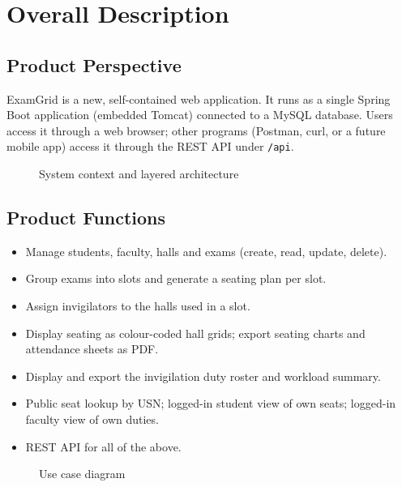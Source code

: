 \documentclass[11pt,a4paper]{article}
\begin{document}
\section{Overall Description}
\subsection{Product Perspective}
ExamGrid is a new, self-contained web application. It runs as a single Spring Boot application (embedded Tomcat) connected to a MySQL database. Users access it through a web browser; other programs (Postman, curl, or a future mobile app) access it through the REST API under \texttt{/api}.

\begin{figure}[H]\centering
\resizebox{0.8\linewidth}{!}{}
\caption{System context and layered architecture}
\end{figure}

\subsection{Product Functions}
\begin{itemize}
  \item Manage students, faculty, halls and exams (create, read, update, delete).
  \item Group exams into slots and generate a seating plan per slot.
  \item Assign invigilators to the halls used in a slot.
  \item Display seating as colour-coded hall grids; export seating charts and attendance sheets as PDF.
  \item Display and export the invigilation duty roster and workload summary.
  \item Public seat lookup by USN; logged-in student view of own seats; logged-in faculty view of own duties.
  \item REST API for all of the above.
\end{itemize}

\begin{figure}[H]\centering
\resizebox{0.95\linewidth}{!}{}
\caption{Use case diagram}
\end{figure}
\end{document}
